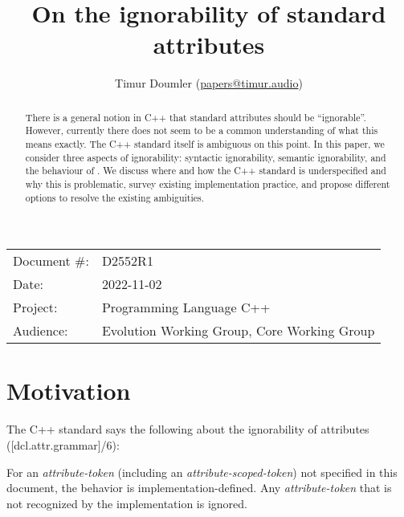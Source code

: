 

\newcommand{\forceindent}{\parindent=1em\indent\parindent=0pt\relax} %


\title{On the ignorability of standard attributes}
\author{
  Timur Doumler \small(\href{mailto:papers@timur.audio}{papers@timur.audio})
}
\date{}
\maketitle

\begin{tabular}{ll}
Document \#: & D2552R1 \\
Date: & 2022-11-02\\
Project: & Programming Language C++ \\
Audience: & Evolution Working Group, Core Working Group
\end{tabular}


\begin{abstract}
There is a general notion in C++ that standard attributes should be ``ignorable''. However, currently there does not seem to be a common understanding of what this means exactly. The C++ standard itself is ambiguous on this point. In this paper, we consider three aspects of ignorability: syntactic ignorability, semantic ignorability, and the behaviour of \mbox{}. We discuss where and how the C++ standard is underspecified and why this is problematic, survey existing implementation practice, and propose different options to resolve the existing ambiguities.
\end{abstract}


\section{Motivation}
\label{sec:motivation}


The C++ standard says the following about the ignorability of attributes ([dcl.attr.grammar]/6):

\begin{adjustwidth}{0.5cm}{0.5cm}
For an \emph{attribute-token} (including an \emph{attribute-scoped-token})  not specified in this document, the behavior is implementation-defined. Any \emph{attribute-token} that is not recognized by the implementation is ignored.
\end{adjustwidth}

